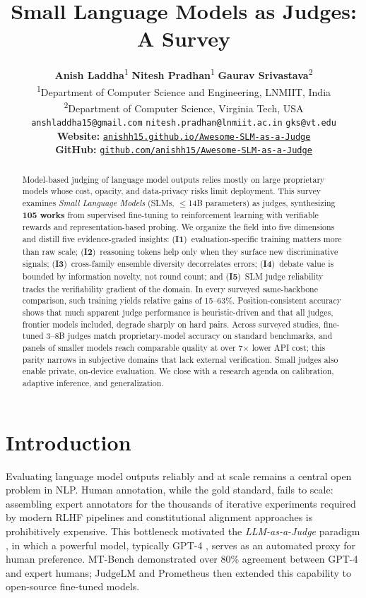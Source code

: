 \documentclass[11pt]{article}
\title{Small Language Models as Judges: A Survey}
\author{
  \textbf{Anish Laddha}\textsuperscript{1} \qquad
  \textbf{Nitesh Pradhan}\textsuperscript{1} \qquad
  \textbf{Gaurav Srivastava}\textsuperscript{2} \\[-1pt]
  \mdseries \textsuperscript{1}Department of Computer Science and Engineering, LNMIIT, India \\[-1pt]
  \mdseries \textsuperscript{2}Department of Computer Science, Virginia Tech, USA \\[1pt]
  \mdseries\small \texttt{anshladdha15@gmail.com} \qquad
  \texttt{nitesh.pradhan@lnmiit.ac.in} \qquad
  \texttt{gks@vt.edu} \\[1pt]
  \mdseries\small \textbf{Website:} \href{https://anishh15.github.io/Awesome-SLM-as-a-Judge/}{\texttt{anishh15.github.io/Awesome-SLM-as-a-Judge}} \\[-3pt]
  \mdseries\small \textbf{GitHub:} \href{https://github.com/anishh15/Awesome-SLM-as-a-Judge}{\texttt{github.com/anishh15/Awesome-SLM-as-a-Judge}}
}
\begin{document}
\raggedbottom
\maketitle

\begin{abstract}
Model-based judging of language model outputs relies mostly on large proprietary models whose cost, opacity, and data-privacy risks limit deployment. This survey examines \textit{Small Language Models} (SLMs, $\leq$14B parameters) as judges, synthesizing \textbf{105 works} from supervised fine-tuning to reinforcement learning with verifiable rewards and representation-based probing. We organize the field into five dimensions and distill five evidence-graded insights:
(\textbf{I1})~evaluation-specific training matters more than raw scale;
(\textbf{I2})~reasoning tokens help only when they surface new discriminative signals;
(\textbf{I3})~cross-family ensemble diversity decorrelates errors;
(\textbf{I4})~debate value is bounded by information novelty, not round count; and
(\textbf{I5})~SLM judge reliability tracks the verifiability gradient of the domain.
In every surveyed same-backbone comparison, such training yields relative gains of 15--63\%. Position-consistent accuracy shows that much apparent judge performance is heuristic-driven and that all judges, frontier models included, degrade sharply on hard pairs. Across surveyed studies, fine-tuned 3--8B judges match proprietary-model accuracy on standard benchmarks, and panels of smaller models reach comparable quality at over 7$\times$ lower API cost; this parity narrows in subjective domains that lack external verification. Small judges also enable private, on-device evaluation. We close with a research agenda on calibration, adaptive inference, and generalization.
\end{abstract}

\section{Introduction}
\label{sec:intro}

Evaluating language model outputs reliably and at scale remains a central open problem in NLP. Human annotation, while the gold standard, fails to scale: assembling expert annotators for the thousands of iterative experiments required by modern RLHF pipelines \citep{ouyang2022training} and constitutional alignment approaches \citep{bai2022constitutional} is prohibitively expensive. This bottleneck motivated the \emph{LLM-as-a-Judge} paradigm \citep{zheng2023judging}, in which a powerful model, typically GPT-4 \citep{achiam2023gpt}, serves as an automated proxy for human preference. MT-Bench demonstrated over 80\% agreement between GPT-4 and expert humans; JudgeLM \citep{zhu2025judgelm} and Prometheus \citep{kim2024prometheus1} then extended this capability to open-source fine-tuned models.
\end{document}
